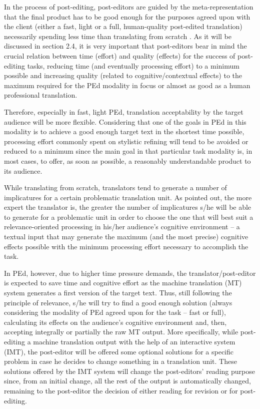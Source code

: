 \documentclass[output=paper]{langsci/langscibook}
\begin{document}
In the process of post-editing, post-editors are guided by the meta-representation that the final product  has to be good enough for the purposes agreed upon with the client (either a fast, light or a full, human-quality post-edited translation) necessarily spending less time than translating from scratch \citep[\textit{cf. }][]{Carl2014process, sanchis2014interactive}. As it will be discussed in section 2.4, it is very important that post-editors bear in mind the crucial relation between time (effort) and quality (effects) for the success of post-editing tasks, reducing time (and eventually processing effort) to a minimum possible and increasing quality (related to cognitive/contextual effects) to the maximum required for the PEd modality in focus or almost as good as a human professional translation.



Therefore, especially in fast, light PEd, translation acceptability by the target audience will be more flexible. Considering that one of the goals in PEd in this modality is to achieve a good enough target text in the shortest time possible, processing effort commonly spent on stylistic refining will tend to be avoided or reduced to a minimum since the main goal in that particular task modality is, in most cases, to offer, as soon as possible, a reasonably understandable product to its audience. 



While translating from scratch, translators tend to generate a number of implicatures for a certain problematic translation unit. As \citet{alves2007modelling} pointed out, the more expert the translator is, the greater the number of implicatures s/he will be able to generate for a problematic unit in order to choose the one that will best suit a relevance-oriented processing in his/her audience’s cognitive environment – a textual input that may generate the maximum (and the most precise) cognitive effects possible with the minimum processing effort necessary to accomplish the task. 



In PEd, however, due to higher time pressure demands, the translator/post-editor is expected to save time and cognitive effort as the machine translation (MT) system generates a first version of the target text. Thus, still following the principle of relevance, s/he will try to find a good enough solution (always considering the modality of PEd agreed upon for the task – fast or full), calculating its effects on the audience’s cognitive environment and, then, accepting integrally or partially the raw MT output. More specifically, while post-editing a machine translation output with the help of an interactive system (IMT), the post-editor will be offered some optional solutions for a specific problem in case he decides to change something in a translation unit. These solutions offered by the IMT system will change the post-editors’ reading purpose since, from an initial change, all the rest of the output is automatically changed, remaining to the post-editor the decision of either reading for revision or  for post-editing. 
\end{document}
